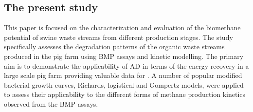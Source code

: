 \subsection{The present study}
This paper is focused on the characterization and evaluation of the biomethane potential of swine waste streams from different production stages. The study specifically assesses the degradation patterns of the organic waste streams produced in the pig farm using BMP assays and kinetic modelling. The primary aim is to demonstrate the applicability of AD in terms of the energy recovery in a large scale pig farm providing valuable data for  . A number of popular modified bacterial growth curves, Richards, logistical and Gompertz models, were applied to assess their applicability to the different forms of methane production kinetics observed from the BMP assays.